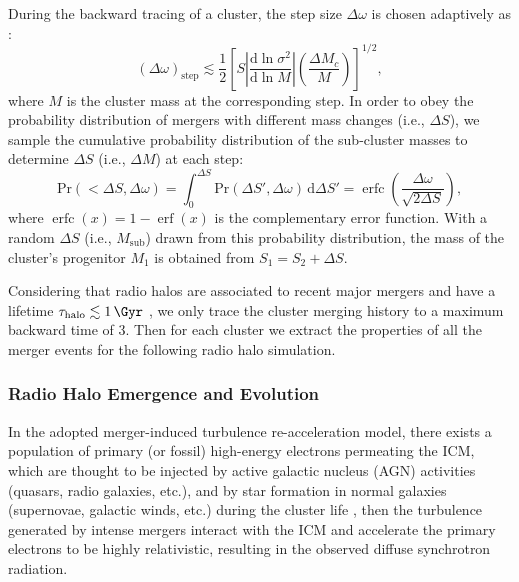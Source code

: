 \documentclass[modern]{aastex62}
\newcommand{\R}[1]{\mathrm{#1}}
\newcommand{\D}[1]{\R{d} #1}
\newcommand{\diff}[2]{\frac{\D{#1}}{\D{#2}}}
\DeclareMathOperator{\erf}{erf}
\DeclareMathOperator{\erfc}{erfc}
\begin{document}
During the backward tracing of a cluster, the step size $\Delta\omega$
is chosen adaptively as \citep{randall2002}:
\begin{equation}
  \label{sec:dw-step}
  (\Delta\omega)_{\R{step}} \lesssim \frac{1}{2} \left[
    S \left| \diff{\ln \sigma^2}{\ln M} \right|
    \left( \frac{\Delta M_c}{M} \right) \right]^{1/2},
\end{equation}
where $M$ is the cluster mass at the corresponding step.
In order to obey the probability distribution of mergers with different
mass changes (i.e., $\Delta S$),
we sample the cumulative probability distribution of the sub-cluster masses
to determine $\Delta S$ (i.e., $\Delta M$) at each step:
\begin{equation}
  \label{sec:cdf-sub-masses}
  \R{Pr}(<\!\Delta S, \Delta\omega) =
  \int_0^{\Delta S} \R{Pr}(\Delta S', \Delta\omega) \,\D{\Delta S'} =
  \erfc \!\left( \frac{\Delta \omega}{\sqrt{2 \Delta S}} \right),
\end{equation}
where $\erfc(x) = 1 - \erf(x)$ is the complementary error function.
With a random $\Delta S$ (i.e., $M_{\R{sub}}$) drawn from this probability
distribution, the mass of the cluster's progenitor $M_1$ is obtained from
$S_1 = S_2 + \Delta S$.

Considering that radio halos are associated to recent major mergers and
have a lifetime $\tau_{\R{halo}} \lesssim \SI{1}{\Gyr}$
\citep[e.g.,][]{brunetti2009,cassano2016},
we only trace the cluster merging history to a maximum backward time of
\SI{3}{\Gyr}.
Then for each cluster we extract the properties of all the merger events
for the following radio halo simulation.


\subsubsection{Radio Halo Emergence and Evolution}
\label{sec:halos}

In the adopted merger-induced turbulence re-acceleration model, there
exists a population of primary (or fossil) high-energy electrons permeating
the ICM, which are thought to be injected by active galactic nucleus (AGN)
activities (quasars, radio galaxies, etc.), and by star formation in
normal galaxies (supernovae, galactic winds, etc.) during the cluster
life \citep[see][for a review]{blasi2007rev},
then the turbulence generated by intense mergers interact with the ICM
and accelerate the primary electrons to be highly relativistic, resulting
in the observed diffuse synchrotron radiation.
\end{document}
